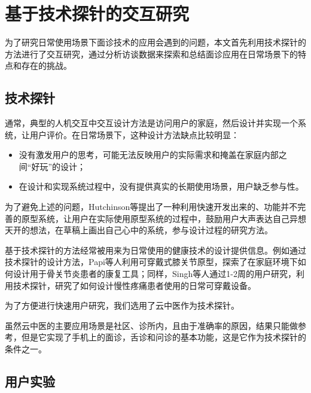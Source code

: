\chapter{基于技术探针的交互研究}

为了研究日常使用场景下面诊技术的应用会遇到的问题，本文首先利用技术探针\cite{Hutchinson2003Technology}的方法进行了交互研究，通过分析访谈数据来探索和总结面诊应用在日常场景下的特点和存在的挑战。


\section{技术探针}

通常，典型的人机交互中交互设计方法是访问用户的家庭，然后设计并实现一个系统，让用户评价。在日常场景下，这种设计方法缺点比较明显\cite{Hutchinson2003Technology}：

\begin{itemize}
    \item 没有激发用户的思考，可能无法反映用户的实际需求和掩盖在家庭内部之间“好玩”的设计；

    \item 在设计和实现系统过程中，没有提供真实的长期使用场景，用户缺乏参与性。  
\end{itemize}


为了避免上述的问题，Hutchinson等\cite{Hutchinson2003Technology}提出了一种利用快速开发出来的、功能并不完善的原型系统，让用户在实际使用原型系统的过程中，鼓励用户大声表达自己异想天开的想法，在草稿上画出自己心中的系统，参与设计过程的研究方法。

基于技术探针的方法经常被用来为日常使用的健康技术的设计提供信息。例如通过技术探针的设计方法，Papi等人\cite{papi2015knee}利用可穿戴式膝关节原型，探索了在家庭环境下如何设计用于骨关节炎患者的康复工具；同样，Singh等人\cite{singh2017supporting}通过1-2周的用户研究，利用技术探针，研究了如何设计慢性疼痛患者使用的日常可穿戴设备。


为了方便进行快速用户研究，我们选用了云中医\cite{Zhang2018Study}作为技术探针。


虽然云中医的主要应用场景是社区、诊所内，且由于准确率的原因，结果只能做参考，但是它实现了手机上的面诊，舌诊和问诊的基本功能，这是它作为技术探针的条件之一。

\section{用户实验}
 
